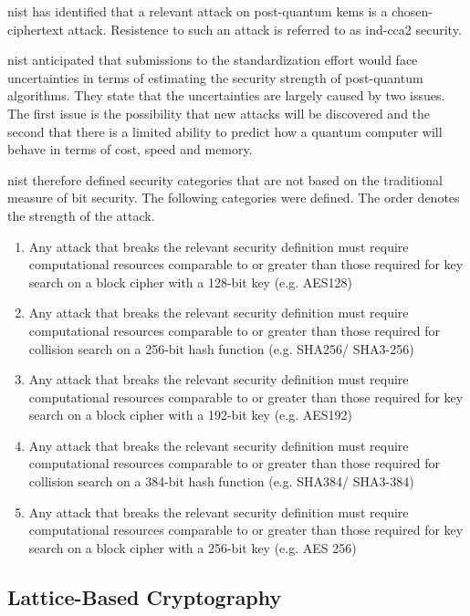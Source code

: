 \gls{nist} has identified that a relevant attack on post-quantum \glspl{kem} is a chosen-ciphertext attack. Resistence to such an attack is referred to as \gls{ind-cca2} security\cite{nist2017}. 

\gls{nist} anticipated that submissions to the standardization effort would face uncertainties in terms of estimating the security strength of post-quantum algorithms. They state that the uncertainties are largely caused by two issues. The first issue is the possibility that new attacks will be discovered and the second that there is a limited ability to predict how a quantum computer will behave in terms of cost, speed and memory\cite{nist2017}.

\gls{nist} therefore defined security categories that are not based on the traditional measure of bit security. The following categories were defined. The order denotes the strength of the attack\cite{nist2017}.

\begin{enumerate}
    \item Any attack that breaks the relevant security definition must require computational resources comparable to or greater than those required for key search on a block cipher with a 128-bit key (e.g. AES128)
    \item Any attack that breaks the relevant security definition must require computational resources comparable to or greater than those required for collision search on a 256-bit hash function (e.g. SHA256/ SHA3-256)
    \item Any attack that breaks the relevant security definition must require computational resources comparable to or greater than those required for key search on a block cipher with a 192-bit key (e.g. AES192)
    \item Any attack that breaks the relevant security definition must require computational resources comparable to or greater than those required for collision search on a 384-bit hash function (e.g. SHA384/ SHA3-384)
    \item Any attack that breaks the relevant security definition must require computational resources comparable to or greater than those required for key search on a block cipher with a 256-bit key (e.g. AES 256)
\end{enumerate}

\subsection{Lattice-Based Cryptography}

